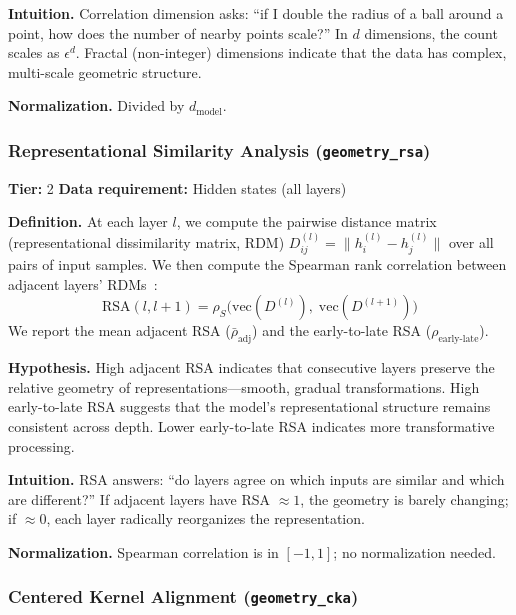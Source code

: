 \documentclass{article}
\begin{document}
\textbf{Intuition.}
Correlation dimension asks: ``if I double the radius of a ball around a point, how does the number of nearby points scale?'' In $d$ dimensions, the count scales as $\epsilon^d$. Fractal (non-integer) dimensions indicate that the data has complex, multi-scale geometric structure.

\textbf{Normalization.} Divided by $d_{\text{model}}$.

\subsubsection{Representational Similarity Analysis (\texttt{geometry\_rsa})}
\label{app:rsa}

\textbf{Tier:} 2 \quad \textbf{Data requirement:} Hidden states (all layers)

\textbf{Definition.}
At each layer $l$, we compute the pairwise distance matrix (representational dissimilarity matrix, RDM) $D^{(l)}_{ij} = \|h_i^{(l)} - h_j^{(l)}\|$ over all pairs of input samples. We then compute the Spearman rank correlation between adjacent layers' RDMs~\citep{kriegeskorte2008representational}:
\begin{equation}
  \text{RSA}(l, l+1) = \rho_S\!\bigl(\text{vec}(D^{(l)}),\; \text{vec}(D^{(l+1)})\bigr)
\end{equation}
We report the mean adjacent RSA ($\bar\rho_{\text{adj}}$) and the early-to-late RSA ($\rho_{\text{early-late}}$).

\textbf{Hypothesis.}
High adjacent RSA indicates that consecutive layers preserve the relative geometry of representations---smooth, gradual transformations. High early-to-late RSA suggests that the model's representational structure remains consistent across depth. Lower early-to-late RSA indicates more transformative processing.

\textbf{Intuition.}
RSA answers: ``do layers agree on which inputs are similar and which are different?'' If adjacent layers have RSA $\approx 1$, the geometry is barely changing; if $\approx 0$, each layer radically reorganizes the representation.

\textbf{Normalization.} Spearman correlation is in $[-1, 1]$; no normalization needed.

\subsubsection{Centered Kernel Alignment (\texttt{geometry\_cka})}
\label{app:cka}
\end{document}
